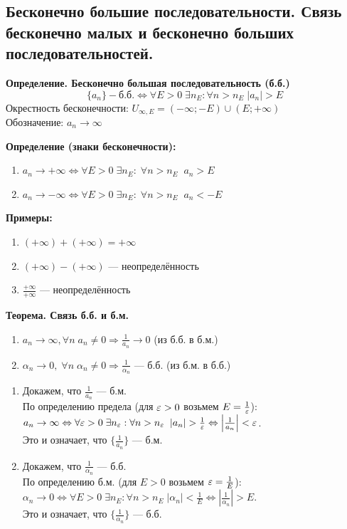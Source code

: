\subsection{Бесконечно большие последовательности. Связь бесконечно малых и бесконечно больших последовательностей.}

\textbf{Определение. Бесконечно большая последовательность (б.б.)} 
\[\{a_n\} - \text{б.б.} \Leftrightarrow \forall E > 0 \; \exists n_E: \forall n > n_E\; |a_n| > E\]
Окрестность бесконечности: $U_{\infty, E} = (-\infty;-E)\cup(E;+\infty)$\\
Обозначение: $a_n \to \infty$

\textbf{Определение (знаки бесконечности):}
\begin{enumerate}
	\item $a_n \to +\infty \Leftrightarrow \forall E > 0\; \exists n_E: \;\forall n > n_E\;\; a_n > E$
	\item $a_n \to -\infty \Leftrightarrow \forall E > 0\; \exists n_E: \;\forall n > n_E\;\; a_n < -E$
\end{enumerate}

\textbf{Примеры:}
\begin{enumerate}
	\item $(+\infty) + (+\infty) = +\infty$
	\item $(+\infty) - (+\infty)$ — неопределённость
	\item $\frac{+\infty}{+\infty}$ — неопределённость
\end{enumerate}

\textbf{Теорема. Связь б.б. и б.м.}
\begin{enumerate}
	\item $a_n \to \infty, \forall n\; a_n \not=0 \Rightarrow \frac{1}{a_n} \to 0$ (из б.б. в б.м.)
	\item $\alpha_n \to 0,\; \forall n\;\alpha_n\not=0 \Rightarrow \frac{1}{\alpha_n}$ — б.б. (из б.м. в б.б.)
\end{enumerate}

\begin{tcolorbox}[title=Доказательство]
	\begin{enumerate}
		\item Докажем, что $\frac{1}{a_n}$ — б.м.\\
		По определению предела (для $\varepsilon > 0$ возьмем $E = \frac{1}{\varepsilon}$):\\
		$a_n \to \infty \Leftrightarrow \forall \varepsilon > 0\; \exists n_\varepsilon: \forall n > n_\varepsilon\;\; |a_n| > \frac{1}{\varepsilon} \Leftrightarrow \left|\frac{1}{a_n}\right| < \varepsilon$. \\
		Это и означает, что $\{\frac{1}{a_n}\}$ — б.м.
		
		\item Докажем, что $\frac{1}{\alpha_n}$ — б.б.\\
		По определению б.м. (для $E > 0$ возьмем $\varepsilon = \frac{1}{E}$):\\
		$\alpha_n \to 0 \Leftrightarrow \forall E > 0\; \exists n_E: \forall n > n_E\; |\alpha_n| < \frac{1}{E} \Leftrightarrow \left|\frac{1}{\alpha_n}\right| > E$. \\
		Это и означает, что $\{\frac{1}{\alpha_n}\}$ — б.б.
	\end{enumerate}
\end{tcolorbox}
